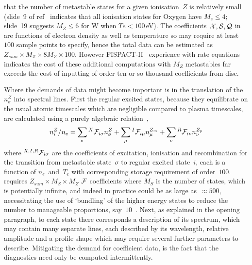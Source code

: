 that the number of metastable states
for a given ionisation~$Z$ is relatively small (slide~9 of ref~\cite{Su06ADAS} indicates that all ionisation
states for Oxygen have $M_z \leq 4$; slide~19 suggests $M_Z\leq6$ for W when $Te<100$\,eV).
The coefficients~$\mathcal{X}, \mathcal{S}, \mathcal{Q}$ in  are functions of electron density as well
as temperature so may require at least~$100$ sample points to specify, hence the total data can be estimated
as~$Z_{sum}\times M_Z\times 8M_Z\times 100$.
However FISPACT-II~\cite{Su17FISP} experience with rate equations indicates the cost of 
these additional computations with $M_Z$ metastables far exceeds
the cost of inputting of order ten or so thousand coefficients from disc.

Where the demands of data might become important is in the translation of the $n^Z_\sigma$ into
spectral lines. First the regular excited states, because they equilibrate on the usual
atomic timescales which are negligible compared to plasma timescales, are calculated 
using a purely algebraic relation~\cite[eq.\ (5)]{Ba03Diel},
\begin{equation} \label{eq:niz}
n_i^Z/n_e = \sum_\sigma {^X\mathcal{F}_{i\sigma}} n^Z_\sigma
+ \sum_\mu {^I\mathcal{F}_{i\mu}} n^{Z_m}_\mu
+ \sum_\nu {^R\mathcal{F}_{i\nu}} n^{Z_p}_\nu
\end{equation}
where $^{X,I,R}\mathcal{F}_{i\sigma}$ are the coefficients of excitation, ionisation and recombination
for the transition from metastable state~$\sigma$ to regular excited state~$i$, each is a function
of $n_e$~and~$T_e$ with corresponding storage requirement of order~$100$.
  requires $Z_{sum} \times M_S \times M_Z$ $\mathcal{F}$ coefficients where $M_S$ is the number of states,
which is potentially infinite, and indeed in practice could be as large as~$\approx 500$,
necessitating the use of `bundling' of the higher energy states to reduce the number to manageable
proportions, say~$10$~\cite {Ba03Diel}.
Next, as explained in the opening paragraph, to each state there corresponds a description of
its spectrum, which may contain
many separate lines, each described by its wavelength, relative amplitude and
a profile shape which may require several further parameters to describe.
Mitigating the demand for coefficient data, is the fact that the diagnostics need only be
computed intermittently.


